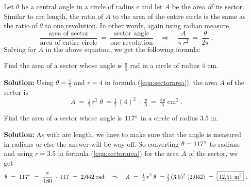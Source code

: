 Let $\theta$ be a central angle in a circle of radius $r$ and let $A$ be the area of its sector.
Similar to arc length, the ratio of $A$ to the area of the entire circle is the same as the ratio
of $\theta$ to one revolution. In other words, again using radian measure,
\begin{displaymath}
 \frac{\text{area of sector}}{\text{area of entire circle}} ~=~
 \frac{\text{sector angle}}{\text{one revolution}} \quad\Rightarrow\quad
 \frac{A}{\pi\,r^2} ~=~ \frac{\theta}{2\pi} ~.
\end{displaymath}
Solving for $A$ in the above equation, we get the following formula:

\begin{center}\end{center}

\begin{exmp}
 Find the area of a sector whose angle is $\frac{\pi}{5}$ rad in a circle of radius $4$
 cm.\vspace{1mm}
 \par\noindent\textbf{Solution:} Using $\theta=\frac{\pi}{5}$ and $r=4$ in formula
 (\ref{eqn:sectorarea}), the area $A$ of the sector is
 \begin{displaymath}
  A ~=~ \tfrac{1}{2}\,r^2 \;\theta ~= \tfrac{1}{2}\,(4)^2 \;\cdot\;\tfrac{\pi}{5}
   ~=~ \boxed{\tfrac{8\pi}{5}~\text{cm}^2} ~.
 \end{displaymath}
\end{exmp}
\begin{exmp}
 Find the area of a sector whose angle is $117^\circ$ in a circle of radius $3.5$ m.\vspace{1mm}
 \par\noindent\textbf{Solution:} As with arc length, we have to make sure that the angle is measured
 in radians or else the answer will be way off. So converting $\theta=117^\circ$ to radians and
 using $r=3.5$ in formula (\ref{eqn:sectorarea}) for the area $A$ of the sector, we get
 \begin{displaymath}
  \theta ~=~ 117^\circ ~=~ \frac{\pi}{180} \;\cdot\; 117 ~=~ 2.042~\text{rad}
  \quad\Rightarrow\quad
  A ~=~ \tfrac{1}{2}\,r^2 \;\theta ~= \tfrac{1}{2}\,(3.5)^2 \;(2.042)
   ~=~ \boxed{12.51~\text{m}^2} ~.
 \end{displaymath}
\end{exmp}
\divider
\vspace{1mm}

